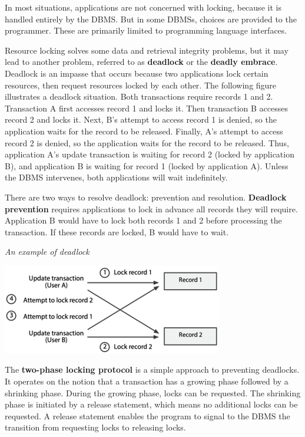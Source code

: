 \documentclass[
]{article}
\begin{document}
In most situations, applications are not concerned with locking, because
it is handled entirely by the DBMS. But in some DBMSs, choices are
provided to the programmer. These are primarily limited to programming
language interfaces.

Resource locking solves some data and retrieval integrity problems, but
it may lead to another problem, referred to as \textbf{deadlock} or the
\textbf{deadly embrace}. Deadlock is an impasse that occurs because two
applications lock certain resources, then request resources locked by
each other. The following figure illustrates a deadlock situation. Both
transactions require records 1 and 2. Transaction A first accesses
record 1 and locks it. Then transaction B accesses record 2 and locks
it. Next, B's attempt to access record 1 is denied, so the application
waits for the record to be released. Finally, A's attempt to access
record 2 is denied, so the application waits for the record to be
released. Thus, application A's update transaction is waiting for record
2 (locked by application B), and application B is waiting for record 1
(locked by application A). Unless the DBMS intervenes, both applications
will wait indefinitely.

There are two ways to resolve deadlock: prevention and resolution.
\textbf{Deadlock prevention} requires applications to lock in advance all
records they will require. Application B would have to lock both records
1 and 2 before processing the transaction. If these records are locked,
B would have to wait.

\emph{An example of deadlock}

\includegraphics{Figures/Chapter 23/deadlock.png}

The \textbf{two-phase locking protocol} is a simple approach to preventing
deadlocks. It operates on the notion that a transaction has a growing
phase followed by a shrinking phase. During the growing phase, locks can
be requested. The shrinking phase is initiated by a release statement,
which means no additional locks can be requested. A release statement
enables the program to signal to the DBMS the transition from requesting
locks to releasing locks.
\end{document}
